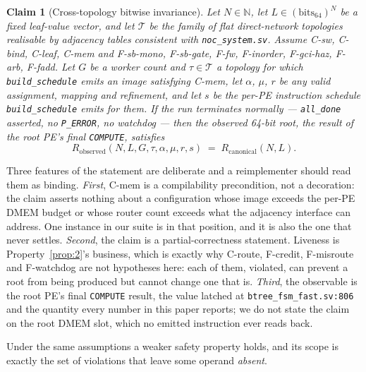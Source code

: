 \documentclass[journal,10pt]{IEEEtran}
\theoremstyle{plain}
\newtheorem{claim}{Claim}
\theoremstyle{definition}
\theoremstyle{remark}
\newcommand{\Rcan}{\ensuremath{R_{\mathrm{canonical}}}}
\newcommand{\sv}[1]{\texttt{#1}}
\newcommand{\T}{\ensuremath{\mathcal{T}}}
\newcommand{\asgn}{\ensuremath{\alpha}}
\newcommand{\map}{\ensuremath{\mu}}
\begin{document}
\begin{claim}[Cross-topology bitwise invariance]\label{claim:1}
Let $N \in \mathbb{N}$, let $L \in (\mathrm{bits}_{64})^N$ be a fixed
leaf-value vector, and let $\T$ be the family of flat direct-network
topologies realisable by adjacency tables consistent with
\sv{noc\_system.sv}. Assume \textsf{C-sw}, \textsf{C-bind},
\textsf{C-leaf}, \textsf{C-mem} and \textsf{F-sb-mono}, \textsf{F-sb-gate},
\textsf{F-fw}, \textsf{F-inorder}, \textsf{F-gci-haz}, \textsf{F-arb},
\textsf{F-fadd}. Let $G$ be a worker count and $\tau \in \T$ a topology for
which \sv{build\_schedule} emits an image satisfying \textsf{C-mem}, let
$\asgn$, $\map$, $r$ be any valid assignment, mapping and refinement, and
let $s$ be the per-PE instruction schedule \sv{build\_schedule} emits for
them. If the run terminates normally --- \sv{all\_done} asserted, no
\texttt{P\_ERROR}, no watchdog --- then the observed 64-bit root, the
result of the root PE's final \texttt{COMPUTE}, satisfies
\begin{equation}
  R_\mathrm{observed}(N, L, G, \tau, \asgn, \map, r, s)
    \;=\; \Rcan(N, L).
\end{equation}
\end{claim}

Three features of the statement are deliberate and a reimplementer should
read them as binding. \emph{First}, \textsf{C-mem} is a compilability
precondition, not a decoration: the claim asserts nothing about a
configuration whose image exceeds the per-PE DMEM budget or whose router
count exceeds what the adjacency interface can address. One instance in our
suite is in that position, and it is also the one that never settles.
\emph{Second}, the claim is a partial-correctness statement. Liveness is
Property~\ref{prop:2}'s business, which is exactly why \textsf{C-route},
\textsf{F-credit}, \textsf{F-misroute} and \textsf{F-watchdog} are not
hypotheses here: each of them, violated, can prevent a root from being
produced but cannot change one that is. \emph{Third}, the observable is the
root PE's final \texttt{COMPUTE} result, the value latched at
\sv{btree\_fsm\_fast.sv:806} and the quantity every number in this paper
reports; we do not state the claim on the root DMEM slot, which no emitted
instruction ever reads back.

Under the same assumptions a weaker safety property holds, and its scope is
exactly the set of violations that leave some operand \emph{absent}.
\end{document}
